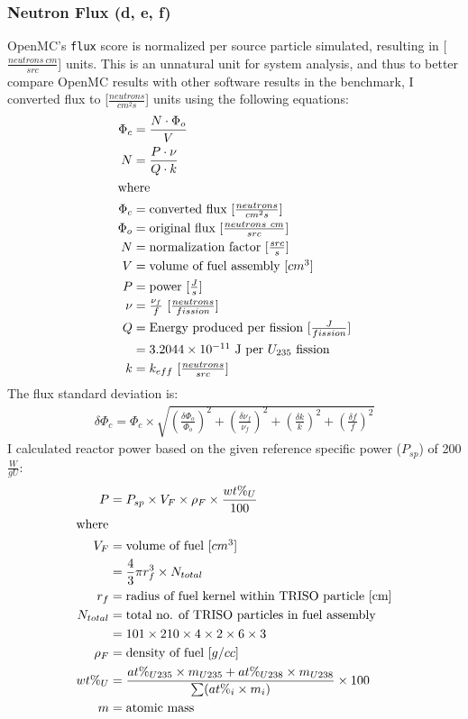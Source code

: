 \subsubsection{Neutron Flux (d, e, f)}
OpenMC's \texttt{flux} score is normalized per source particle simulated, resulting 
in [$\frac{neutrons\ cm}{src}$] units.
This is an unnatural unit for system analysis, and thus to better compare OpenMC
results with other software results in the benchmark, I converted flux to 
[$\frac{neutrons}{cm^2s}$] units using the following equations:  
\begin{align}
    \Phi_c &= \frac{N \cdot \Phi_o}{V} \\
    N &= \frac{P\cdot\nu}{Q\cdot k} \\
    \intertext{where}
    \Phi_c &= \mbox{converted flux [$\frac{neutrons}{cm^2s}$]} \nonumber \\ 
    \Phi_o &= \mbox{original flux [$\frac{neutrons\ cm}{src}$]} \nonumber \\
    N &= \mbox{normalization factor [$\frac{src}{s}$]} \nonumber \\
    V &= \mbox{volume of fuel assembly [$cm^3$]} \nonumber \\
    P &= \mbox{power [$\frac{J}{s}$]} \nonumber \\
    \nu &= \mbox{$\frac{\nu_f}{f}$ [$\frac{neutrons}{fission}$]} \nonumber \\
    Q &= \mbox{Energy produced per fission [$\frac{J}{fission}$]} \nonumber \\
    &= \mbox{$3.2044 \times 10^{-11}$ J per $U_{235}$ fission} \nonumber \\
    k &= \mbox{$k_{eff}$ [$\frac{neutrons}{src}$]} \nonumber 
\end{align}
The flux standard deviation is: 
\begin{align}
    \delta \Phi_c = \Phi_c \times
    \sqrt{(\frac{\delta \Phi_o}{\Phi_o})^2+ (\frac{\delta \nu_f}{\nu_f})^2 
    + (\frac{\delta k}{k})^2 + (\frac{\delta f}{f})^2}
\end{align}
I calculated reactor power based on the given reference specific power 
($P_{sp}$) of 200 $\frac{W}{gU}$: 
\begin{align}
    P &= P_{sp} \times V_F \times \rho_F \times \frac{wt\%_{U}}{100} \\
    \intertext{where}
    V_F &= \mbox{volume of fuel [$cm^3$]} \nonumber \\ 
    &= \frac{4}{3} \pi r_f^3 \times N_{total} \nonumber \\
    r_f &= \mbox{radius of fuel kernel within TRISO particle [cm]} \nonumber\\
    N_{total} &= \mbox{total no. of TRISO particles in fuel assembly} \nonumber \\ 
    &= 101 \times 210 \times 4 \times 2 \times 6 \times 3 \nonumber\\ 
    \rho_F &= \mbox{density of fuel [$g/cc$]} \nonumber \\
    wt\%_{U} &= \frac{at\%_{U235} \times m_{U235} + at\%_{U238} \times m_{U238}}{\sum (at\%_i \times m_i)} \times 100 \nonumber\\
    m &= \mbox{atomic mass} \nonumber
\end{align}

